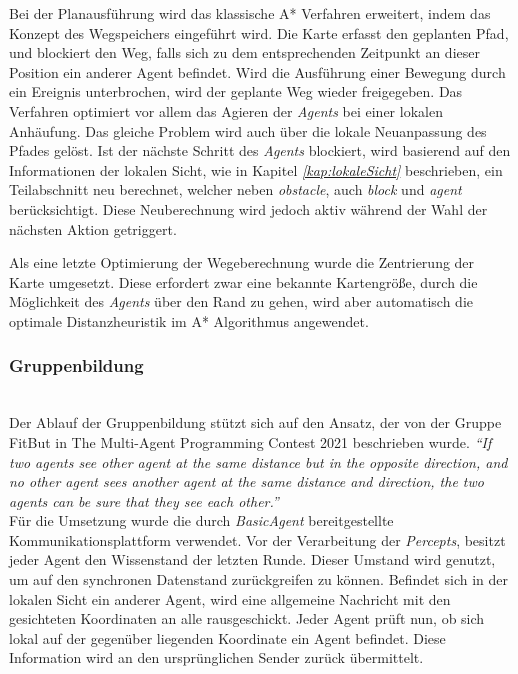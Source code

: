 Bei der Planausführung wird das klassische A* Verfahren erweitert, indem das Konzept des Wegspeichers eingeführt wird. Die Karte erfasst den geplanten Pfad, und blockiert den Weg, falls sich zu dem entsprechenden Zeitpunkt an dieser Position ein anderer Agent befindet.  Wird die Ausführung einer Bewegung durch ein Ereignis unterbrochen, wird der geplante Weg wieder freigegeben. Das Verfahren optimiert vor allem das Agieren der \textit{Agents} bei einer lokalen Anhäufung. Das gleiche Problem wird auch über die lokale Neuanpassung des Pfades gelöst. Ist der nächste Schritt des \textit{Agents} blockiert, wird basierend auf den Informationen der lokalen Sicht, wie in Kapitel \textit{\ref{kap:lokaleSicht}} beschrieben, ein Teilabschnitt neu berechnet, welcher neben \textit{obstacle}, auch \textit{block} und \textit{agent} berücksichtigt. Diese Neuberechnung wird jedoch aktiv während der Wahl der nächsten Aktion getriggert. \newline

Als eine letzte Optimierung der Wegeberechnung wurde die Zentrierung der Karte umgesetzt. Diese erfordert zwar eine bekannte Kartengröße, durch die Möglichkeit des \textit{Agents} über den Rand zu gehen, wird aber automatisch die optimale Distanzheuristik im A* Algorithmus angewendet.



\subsubsection{Gruppenbildung} \label{kap:Gruppenbildung} ~\\
Der Ablauf der Gruppenbildung stützt sich auf den Ansatz, der von der Gruppe FitBut in \glqq{}The Multi-Agent Programming Contest 2021\grqq{} beschrieben wurde. \textit{ “If two agents see other agent at the same distance but in the opposite direction, and no other agent sees another agent at the same distance and direction, the two agents can be sure that they see each other.”}\cite{ref_book1}  \\

Für die Umsetzung wurde die durch \textit{BasicAgent}  bereitgestellte Kommunikationsplattform verwendet. Vor der Verarbeitung der \textit{Percepts}, besitzt jeder Agent den Wissenstand der letzten Runde. Dieser Umstand wird genutzt, um auf den synchronen Datenstand zurückgreifen zu können. Befindet sich in der lokalen Sicht ein anderer Agent, wird eine allgemeine Nachricht mit den gesichteten Koordinaten an alle rausgeschickt. Jeder Agent prüft nun, ob sich lokal auf der gegenüber liegenden Koordinate ein Agent befindet. Diese Information wird an den ursprünglichen Sender zurück übermittelt.  \\

